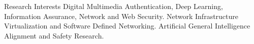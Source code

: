 \begin{rubric}{Research Interests}
    \entry*[]
    Digital Multimedia Authentication, Deep Learning, Information Assurance, Network and Web Security.
    \entry*[]
    Network Infrastructure Virtualization and Software Defined Networking. 
    \entry*[]
    Artificial General Intelligence Alignment and Safety Research.
\end{rubric}